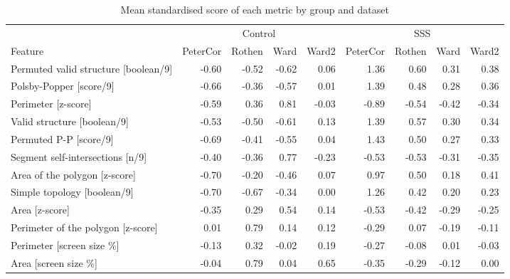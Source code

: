 \documentclass[
  man,
  floatsintext,
  longtable,
  nolmodern,
  notxfonts,
  notimes,
  colorlinks=true,linkcolor=blue,citecolor=blue,urlcolor=blue]{apa7}
\begin{document}
\begin{table}

{\caption{{Mean standardised score of each metric by group and
dataset}{\label{tbl-apx02b}}}
\vspace{-20pt}}

\fontsize{12.0pt}{14.0pt}\selectfont
\begin{tabular*}{\linewidth}{@{\extracolsep{\fill}}>{\raggedright\arraybackslash}p{\dimexpr 112.50pt -2\tabcolsep-1.5\arrayrulewidth}rrrrrrrr}
\toprule
 & \multicolumn{4}{c}{{Control}} & \multicolumn{4}{c}{{SSS}} \\ 
\cmidrule(lr){2-5} \cmidrule(lr){6-9}
Feature & PeterCor & Rothen & Ward & Ward2 & PeterCor & Rothen & Ward & Ward2 \\ 
\midrule\addlinespace[2.5pt]
Permuted valid structure [boolean/9] & -0.60 & -0.52 & -0.62 &  0.06 &  1.36 &  0.60 &  0.31 &  0.38 \\ 
Polsby-Popper [score/9] & -0.66 & -0.36 & -0.57 &  0.01 &  1.39 &  0.48 &  0.28 &  0.36 \\ 
Perimeter [z-score] & -0.59 &  0.36 &  0.81 & -0.03 & -0.89 & -0.54 & -0.42 & -0.34 \\ 
Valid structure [boolean/9] & -0.53 & -0.50 & -0.61 &  0.13 &  1.39 &  0.57 &  0.30 &  0.34 \\ 
Permuted P-P [score/9] & -0.69 & -0.41 & -0.55 &  0.04 &  1.43 &  0.50 &  0.27 &  0.33 \\ 
Segment self-intersections [n/9] & -0.40 & -0.36 &  0.77 & -0.23 & -0.53 & -0.53 & -0.31 & -0.35 \\ 
Area of the polygon [z-score] & -0.70 & -0.20 & -0.46 &  0.07 &  0.97 &  0.50 &  0.18 &  0.41 \\ 
Simple topology [boolean/9] & -0.70 & -0.67 & -0.34 &  0.00 &  1.26 &  0.42 &  0.20 &  0.23 \\ 
Area [z-score] & -0.35 &  0.29 &  0.54 &  0.14 & -0.53 & -0.42 & -0.29 & -0.25 \\ 
Perimeter of the polygon [z-score] &  0.01 &  0.79 &  0.14 &  0.12 & -0.29 &  0.07 & -0.19 & -0.11 \\ 
Perimeter [screen size \%] & -0.13 &  0.32 & -0.02 &  0.19 & -0.27 & -0.08 &  0.01 & -0.03 \\ 
Area [screen size \%] & -0.04 &  0.79 &  0.04 &  0.65 & -0.35 & -0.29 & -0.12 &  0.00 \\ 
\bottomrule
\end{tabular*}

\end{table}
\end{document}
